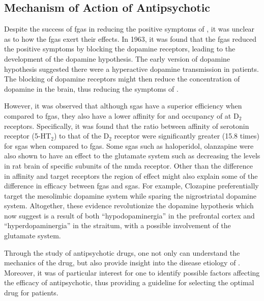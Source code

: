 \documentclass[12pt]{book}
\newcommand*{\glng}{\glsentrylong}
\begin{document}
	\subsection{Mechanism of Action of Antipsychotic}
	Despite the success of \glspl{fga} in reducing the positive symptoms of \glng{scz}, it was unclear as to how the \glspl{fga} exert their effects.
	In 1963, it was found that the \glspl{fga} reduced the positive symptoms by blocking the dopamine receptors\citep{Lehmann1997}, leading to the development of the dopamine hypothesis.
	The early version of dopamine hypothesis suggested there were a hyperactive dopamine transmission in \glng{scz} patients. 
	The blocking of dopamine receptors might then reduce the concentration of dopamine in the brain, thus reducing the symptoms of \glng{scz}\citep{Howes2009}.
	
	However, it was observed that although \glspl{sga} have a superior efficiency when compared to \glspl{fga}, they also have a lower affinity for and occupancy of at D$_2$ receptors.
	Specifically, it was found that the ratio between affinity of serotonin receptor (5-HT$_2$) to that of the D$_2$ receptor were significantly greater (15.8 times) for \glspl{sga} when compared to \glspl{fga}\citep{Meltzer1991}.
	Some \glspl{sga} such as  haloperidol, olanzapine were also shown to have an effect to the glutamate system such as decreasing the levels in rat brain of specific subunits of the \gls{nmda} receptor\citep{Meltzer2004}.
	Other than the difference in affinity and target receptors the region of effect might also explain some of the difference in efficacy between \glspl{fga} and \glspl{sga}. 
	For example, Clozapine preferentially target the mesolimbic dopamine system while sparing the nigrostriatal dopamine system\citep{Gardner1993}.
	Altogether, these evidence revolutionize the dopamine hypothesis which now suggest \glng{scz} is a result of both ``hypodopaminergia'' in the prefrontal cortex and ``hyperdopaminergia'' in the straitum\citep{Howes2009}, with a possible involvement of the glutamate system.
	
	Through the study of antipsychotic drugs, one not only can understand the mechanics of the drug, but also provide insight into the disease etiology of \glng{scz}.
	Moreover, it was of particular interest for one to identify possible factors affecting the efficacy of antipsychotic, thus providing a guideline for selecting the optimal drug for \glng{scz} patients.
	
\end{document}
